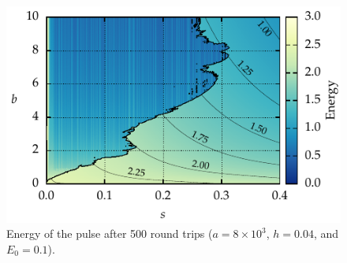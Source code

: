 \documentclass[9pt,twocolumn,twoside]{osajnl}
\begin{document}
\begin{figure}[tbp]
	\centering
	\includegraphics{Figures/ParamSpaceEnergy}
	\caption{Energy of the pulse after 500 round trips ($a = 8 \times 10^3$, $h = 0.04$, and $E_0 = 0.1$).}
	\label{fig:energy}
\end{figure}
\end{document}
